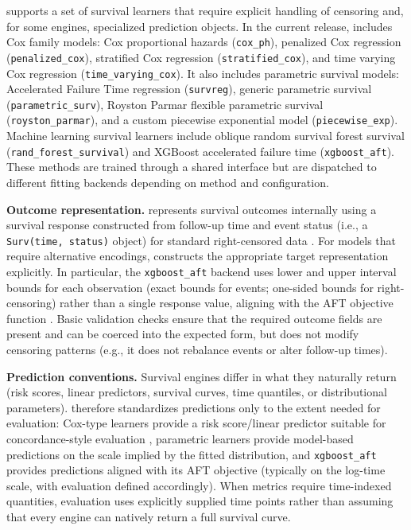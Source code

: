  supports a set of survival learners that require explicit handling of censoring and, for some engines, specialized prediction objects. In the current release,  includes Cox family models: Cox proportional hazards (\texttt{cox\_ph}), penalized Cox regression (\texttt{penalized\_cox}), stratified Cox regression (\texttt{stratified\_cox}), and time varying Cox regression (\texttt{time\_varying\_cox}). It also includes parametric survival models: Accelerated Failure Time regression (\texttt{survreg}), generic parametric survival (\texttt{parametric\_surv}), Royston Parmar flexible parametric survival (\texttt{royston\_parmar}), and a custom piecewise exponential model (\texttt{piecewise\_exp}). Machine learning survival learners include oblique random survival forest survival (\texttt{rand\_forest\_survival}) and XGBoost accelerated failure time (\texttt{xgboost\_aft}). These methods are trained through a shared interface but are dispatched to different fitting backends depending on method and configuration.

\textbf{Outcome representation.}
 represents survival outcomes internally using a survival response constructed from follow-up time and event status (i.e., a \texttt{Surv(time,\ status)} object) for standard right-censored data \citep{Therneau:2000_survival_book, Therneau:2024_survival_Rpkg}. For models that require alternative encodings,  constructs the appropriate target representation explicitly. In particular, the \texttt{xgboost\_aft} backend uses lower and upper interval bounds for each observation (exact bounds for events; one-sided bounds for right-censoring) rather than a single response value, aligning with the AFT objective function \citep{Barnwal:2020_arXiv}. Basic validation checks ensure that the required outcome fields are present and can be coerced into the expected form, but  does not modify censoring patterns (e.g., it does not rebalance events or alter follow-up times).

\textbf{Prediction conventions.}
Survival engines differ in what they naturally return (risk scores, linear predictors, survival curves, time quantiles, or distributional parameters).  therefore standardizes predictions only to the extent needed for evaluation: Cox-type learners provide a risk score/linear predictor suitable for concordance-style evaluation \citep{Harrell:1982aa}, parametric learners provide model-based predictions on the scale implied by the fitted distribution, and \texttt{xgboost\_aft} provides predictions aligned with its AFT objective (typically on the log-time scale, with evaluation defined accordingly). When metrics require time-indexed quantities, evaluation uses explicitly supplied time points rather than assuming that every engine can natively return a full survival curve.

